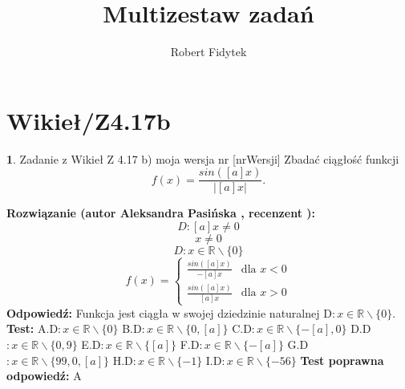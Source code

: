 \documentclass[12pt, a4paper]{article}
\title{Multizestaw zadań}
\author{Robert Fidytek}
\date{}
\theoremstyle{definition} %
\newtheorem{zad}{}
\newcommand{\kategoria}[1]{\section{#1}} %
\newcommand{\zadStart}[1]{\begin{zad}#1\newline} %
\newcommand{\zadStop}{\end{zad}}   %
\newcommand{\rozwStart}[2]{\noindent \textbf{Rozwiązanie (autor #1 , recenzent #2): }\newline} %
\newcommand{\rozwStop}{\newline}                                            %
\newcommand{\odpStart}{\noindent \textbf{Odpowiedź:}\newline}    %
\newcommand{\odpStop}{\newline}                                             %
\newcommand{\testStart}{\noindent \textbf{Test:}\newline} %
\newcommand{\testStop}{\newline} %
\newcommand{\kluczStart}{\noindent \textbf{Test poprawna odpowiedź:}\newline} %
\newcommand{\kluczStop}{\newline} %
\begin{document}
\maketitle


\kategoria{Wikieł/Z4.17b}
\zadStart{Zadanie z Wikieł Z 4.17 b) moja wersja nr [nrWersji]}
Zbadać ciągłość funkcji $$f(x)=\frac{sin([a]x)}{|[a]x|}.$$
\zadStop
\rozwStart{Aleksandra Pasińska}{}
$$D:[a]x\neq 0$$
$$x\neq0$$
$$D:x\in \mathbb{R}\backslash \{0\}$$
$$f(x)= \left\{ \begin{array}{ll}
\frac{sin([a]x)}{-[a]x} & \textrm{dla $x<0$}\\
\frac{sin([a]x)}{[a]x} & \textrm{dla $x>0$} 
\end{array} \right.$$
\rozwStop
\odpStart
Funkcja jest ciągła w swojej dziedzinie naturalnej D$:x\in \mathbb{R}\backslash \{0\}$.\\
\odpStop
\testStart
A.D$:x\in \mathbb{R}\backslash \{0\}$
B.D$:x\in \mathbb{R}\backslash \{0,[a]\}$
C.D$:x\in \mathbb{R}\backslash \{-[a],0\}$
D.D$:x\in \mathbb{R}\backslash \{0,9\}$
E.D$:x\in \mathbb{R}\backslash \{[a]\}$
F.D$:x\in \mathbb{R}\backslash \{-[a]\}$
G.D$:x\in \mathbb{R}\backslash \{99,0,[a]\}$
H.D$:x\in \mathbb{R}\backslash \{-1\}$
I.D$:x\in \mathbb{R}\backslash \{-56\}$
\testStop
\kluczStart
A
\kluczStop
\end{document}
